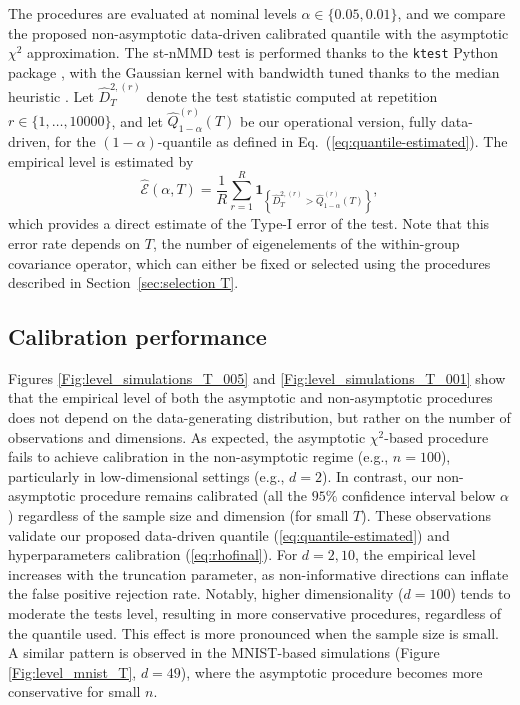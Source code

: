 \documentclass[twoside,11pt]{article}
\newcommand{\hatqmajfin}{\widehat{Q}}
\begin{document}
The procedures are evaluated at nominal levels $\alpha \in \{0.05,0.01\}$, and we compare the proposed non-asymptotic data-driven calibrated quantile with the asymptotic $\chi^2$ approximation. The st-nMMD test is performed thanks to the \texttt{ktest} Python package \citep{ozier2024kernel}, with the Gaussian kernel with bandwidth tuned thanks to the median heuristic \citep{garreau2017large}. Let $\widehat{D}^{2,(r)}_T$ denote the test statistic computed at repetition $r \in \{1, \ldots,10000\} $, and let   $\hatqmajfin_{1-\alpha}^{(r)}(T)$ be our operational version, fully data-driven, for the $(1-\alpha)$-quantile as defined in Eq.~(\ref{eq:quantile-estimated}). The empirical level is estimated by
\[
\widehat{\mathcal{E}}(\alpha,T)
=
\frac{1}{R}
\sum_{r=1}^{R}
\mathbf{1}_{
\left\{
\widehat{D}^{2,(r)}_T
>
\hatqmajfin_{1-\alpha}^{(r)}(T) 
\right\}},
\]
which provides a direct estimate of the Type-I error of the test. Note that this error rate depends on $T$, the number of eigenelements of the within-group covariance operator, which can either be fixed or selected using the procedures described in Section~\ref{sec:selection T}.
\subsection{Calibration performance}\label{sec: type I error}
Figures \ref{Fig:level_simulations_T_005} and  \ref{Fig:level_simulations_T_001} show that the empirical level of both the asymptotic and non-asymptotic procedures does not depend on the data-generating distribution, but rather on the number of observations and dimensions. As expected, the asymptotic $\chi^2$-based procedure fails to achieve calibration in the non-asymptotic regime (e.g., $n=100$), particularly in low-dimensional settings (e.g., $d=2$). In contrast, our non-asymptotic procedure remains calibrated (all the $95\%$ confidence interval below $\alpha$) regardless of the sample size and dimension (for small $T$). These observations validate our proposed data-driven quantile (\ref{eq:quantile-estimated}) and hyperparameters calibration (\ref{eq:rhofinal}). For $d = 2,10$, the empirical level  increases with the truncation parameter, as non-informative directions can inflate the false positive rejection rate. Notably, higher dimensionality ($d=100$) tends to moderate the tests level,  resulting in more conservative procedures, regardless of the quantile used. This effect is more pronounced when the sample size is small. A similar pattern is observed in the MNIST-based simulations (Figure \ref{Fig:level_mnist_T}, $d = 49$), where the asymptotic procedure becomes more conservative for small $n$.
\end{document}
